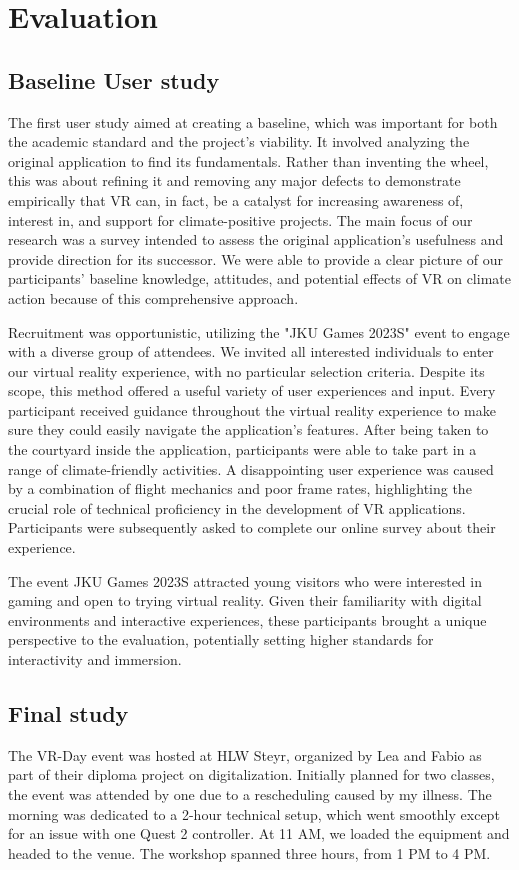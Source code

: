\documentclass[draft, final]{vutinfth} %
\begin{document}
\chapter{Evaluation}
\section{Baseline User study}
The first user study aimed at creating a baseline, which was important for both the academic standard and the project's viability. It involved analyzing the original application to find its fundamentals. Rather than inventing the wheel, this was about refining it and removing any major defects to demonstrate empirically that VR can, in fact, be a catalyst for increasing awareness of, interest in, and support for climate-positive projects. The main focus of our research was a survey intended to assess the original application's usefulness and provide direction for its successor. We were able to provide a clear picture of our participants' baseline knowledge, attitudes, and potential effects of VR on climate action because of this comprehensive approach.

Recruitment was opportunistic, utilizing the "JKU Games 2023S" event to engage with a diverse group of attendees. We invited all interested individuals to enter our virtual reality experience, with no particular selection criteria. Despite its scope, this method offered a useful variety of user experiences and input. Every participant received guidance throughout the virtual reality experience to make sure they could easily navigate the application's features. After being taken to the courtyard inside the application, participants were able to take part in a range of climate-friendly activities. A disappointing user experience was caused by a combination of flight mechanics and poor frame rates, highlighting the crucial role of technical proficiency in the development of VR applications. Participants were subsequently asked to complete our online survey about their experience.

The event JKU Games 2023S attracted young visitors who were interested in gaming and open to trying virtual reality. Given their familiarity with digital environments and interactive experiences, these participants brought a unique perspective to the evaluation, potentially setting higher standards for interactivity and immersion.

    
\section{Final study}
The VR-Day event was hosted at HLW Steyr, organized by Lea and Fabio as part of their diploma project on digitalization. Initially planned for two classes, the event was attended by one due to a rescheduling caused by my illness. The morning was dedicated to a 2-hour technical setup, which went smoothly except for an issue with one Quest 2 controller. At 11 AM, we loaded the equipment and headed to the venue. The workshop spanned three hours, from 1 PM to 4 PM.
\end{document}
